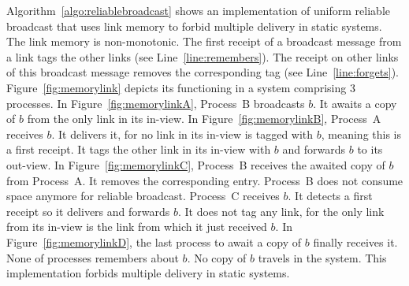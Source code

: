
Algorithm~\ref{algo:reliablebroadcast} shows an implementation of uniform
reliable broadcast that uses link memory to forbid multiple delivery in static
systems. The link memory is non-monotonic. The first receipt of a broadcast
message from a link tags the other links (see Line~\ref{line:remembers}). The
receipt on other links of this broadcast message removes the corresponding tag
(see Line~\ref{line:forgets}). Figure~\ref{fig:memorylink} depicts its
functioning in a system comprising 3 processes. In Figure~\ref{fig:memorylinkA},
Process~B broadcasts $b$. It awaits a copy of $b$ from the only link in its
in-view. In Figure~\ref{fig:memorylinkB}, Process~A receives $b$. It delivers
it, for no link in its in-view is tagged with $b$, meaning this is a first
receipt. It tags the other link in its in-view with $b$ and forwards $b$ to its
out-view. In Figure~\ref{fig:memorylinkC}, Process~B receives the awaited copy
of $b$ from Process~A. It removes the corresponding entry. Process~B does not
consume space anymore for reliable broadcast. Process~C receives $b$. It detects
a first receipt so it delivers and forwards $b$. It does not tag any link, for
the only link from its in-view is the link from which it just received $b$. In
Figure~\ref{fig:memorylinkD}, the last process to await a copy of $b$ finally
receives it. None of processes remembers about $b$. No copy of $b$ travels in
the system. This implementation forbids multiple delivery in static systems.


